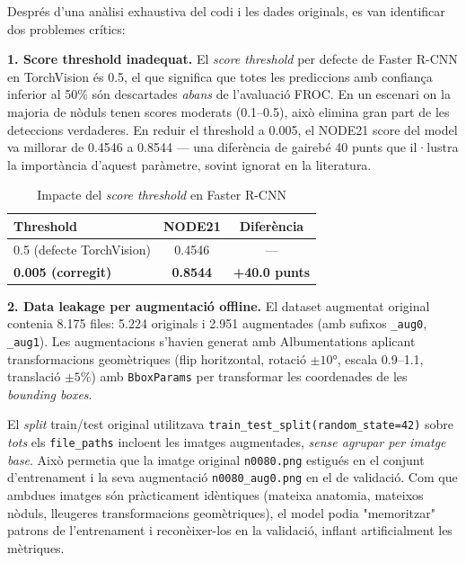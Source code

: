 Després d'una anàlisi exhaustiva del codi i les dades originals, es van identificar dos problemes crítics:

\textbf{1. Score threshold inadequat.} El \textit{score threshold} per defecte de Faster R-CNN en TorchVision és 0.5, el que significa que totes les prediccions amb confiança inferior al 50\% són descartades \textit{abans} de l'avaluació FROC. En un escenari on la majoria de nòduls tenen scores moderats (0.1--0.5), això elimina gran part de les deteccions verdaderes. En reduir el threshold a 0.005, el NODE21 score del model va millorar de 0.4546 a 0.8544 --- una diferència de gairebé 40 punts que il·lustra la importància d'aquest paràmetre, sovint ignorat en la literatura.

\begin{table}[H]
\centering
\caption{Impacte del \textit{score threshold} en Faster R-CNN}
\label{tab:threshold}
\begin{tabular}{lcc}
\toprule
\textbf{Threshold} & \textbf{NODE21} & \textbf{Diferència} \\
\midrule
0.5 (defecte TorchVision) & 0.4546 & --- \\
\textbf{0.005 (corregit)} & \textbf{0.8544} & \textbf{+40.0 punts} \\
\bottomrule
\end{tabular}
\end{table}

\textbf{2. Data leakage per augmentació offline.} El dataset augmentat original contenia 8.175 files: 5.224 originals i 2.951 augmentades (amb sufixos \texttt{\_aug0}, \texttt{\_aug1}). Les augmentacions s'havien generat amb Albumentations aplicant transformacions geomètriques (flip horitzontal, rotació $\pm 10°$, escala 0.9--1.1, translació $\pm 5\%$) amb \texttt{BboxParams} per transformar les coordenades de les \textit{bounding boxes}.

El \textit{split} train/test original utilitzava \texttt{train\_test\_split(random\_state=42)} sobre \textit{tots} els \texttt{file\_paths} incloent les imatges augmentades, \textit{sense agrupar per imatge base}. Això permetia que la imatge original \texttt{n0080.png} estigués en el conjunt d'entrenament i la seva augmentació \texttt{n0080\_aug0.png} en el de validació. Com que ambdues imatges són pràcticament idèntiques (mateixa anatomia, mateixos nòduls, lleugeres transformacions geomètriques), el model podia "memoritzar" patrons de l'entrenament i reconèixer-los en la validació, inflant artificialment les mètriques.


